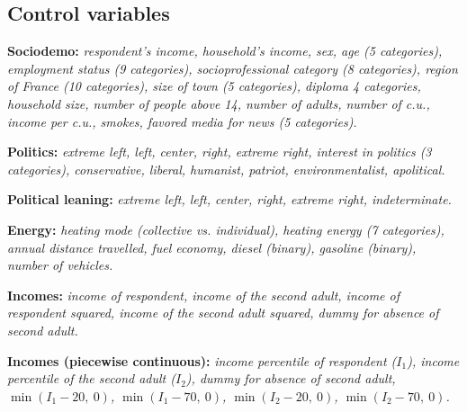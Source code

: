 \documentclass[12pt]{article} %
\begin{document}
\begin{appendices}
\clearpage

\section{Control variables}\label{set_controls}

\textbf{Sociodemo:} \textit{respondent's income, household's income, sex, age \textnormal{(5 categories)}, employment status \textnormal{(9 categories)}, socioprofessional category \textnormal{(8 categories)}, region of France \textnormal{(10 categories)}, size of town \textnormal{(5 categories)}, diploma \textnormal{4 categories}, household size, number of people above 14, number of adults, number of c.u., income per c.u., smokes, favored media for news \textnormal{(5 categories)}.}

\vspace{0.5cm}

\noindent
\textbf{Politics:} \textit{extreme left, left, center, right, extreme right, interest in politics \textnormal{(3 categories)}, conservative, liberal, humanist, patriot, environmentalist, apolitical.}

\vspace{0.5cm}

\noindent
\textbf{Political leaning:} \textit{extreme left, left, center, right, extreme right, indeterminate.}

\vspace{0.5cm}

\noindent
\textbf{Energy:} \textit{heating mode \textnormal{(collective vs. individual)}, heating energy \textnormal{(7 categories)}, annual distance travelled, fuel economy, diesel \textnormal{(binary)}, gasoline \textnormal{(binary)}, number of vehicles.}

\vspace{0.5cm}

\noindent
\textbf{Incomes:} \textit{income of respondent, income of the second adult, income of respondent squared, income of the second adult squared, dummy for absence of second adult.}

\vspace{0.5cm}

\noindent
\textbf{Incomes (piecewise continuous):} \textit{income percentile of respondent ($I_1$), income percentile of the second adult ($I_2$), dummy for absence of second adult, $\min\left(I_1-20,\:0\right)$, $\min\left(I_1-70,\:0\right)$, $\min\left(I_2-20,\:0\right)$, $\min\left(I_2-70,\:0\right)$.}

\vspace{0.5cm}


\end{appendices}
\end{document}
